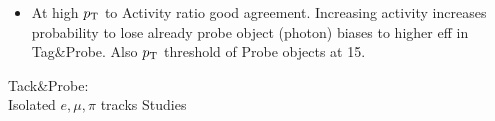 \documentclass{beamer}
\begin{document}
\begin{frame}
\begin{columns}
\begin{column}{0.33\textwidth}
   \end{column}
  \end{columns}
\begin{itemize}
 \item At high $p_{\text{T}}$ to Activity ratio good agreement. Increasing activity increases probability to lose already probe object (photon) biases to higher eff in Tag\&Probe. Also $p_{\text{T}}$ threshold of Probe objects at 15\gev.
\end{itemize}

\end{frame}




\begin{frame}
 \begin{block}{}
 \centering
 \Large Tack\&Probe:\\Isolated $e,\mu,\pi$ tracks Studies
 \end{block}
\end{frame}
\end{document}
